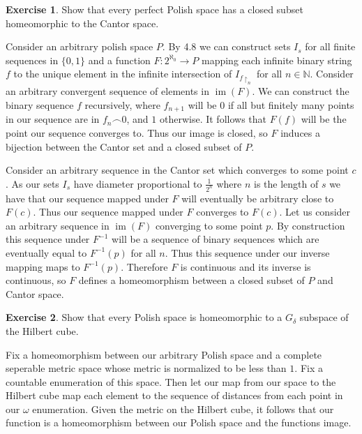 \documentclass{article}
\theoremstyle{definition}
\newtheorem{exer}{Exercise}[section]
\newcommand{\N}{\mathbb{N}}
\DeclareMathOperator{\im}{im}
\newlength{\defparindent}
\newenvironment{answer}
    {\begin{mdframed}[backgroundcolor=gray!15, linewidth=0pt] \setlength{\parindent}{\defparindent}}
    {\end{mdframed}}
\begin{document}
\begin{exer}
    Show that every perfect Polish space has a closed subset homeomorphic to the Cantor space.
    \begin{answer}
        Consider an arbitrary polish space $P$. By 4.8 we can construct sets $I_s$ for all finite sequences in $\{0, 1\}$ and a function $F: 2^{\aleph_0} \to P$ mapping each infinite binary string $f$ to the unique element in the infinite intersection of $I_{f\restriction_{n}}$ for all $n \in \N$. Consider an arbitrary convergent sequence of elements in $\im(F)$. We can construct the binary sequence $f$ recursively, where $f_{n + 1}$ will be $0$ if all but finitely many points in our sequence are in $f_{n} \frown 0$, and $1$ otherwise. It follows that $F(f)$ will be the point our sequence converges to. Thus our image is closed, so $F$ induces a bijection between the Cantor set and a closed subset of $P$.

        Consider an arbitrary sequence in the Cantor set which converges to some point $c$. As our sets $I_s$ have diameter proportional to $\frac{1}{2^n}$ where $n$ is the length of $s$ we have that our sequence mapped under $F$ will eventually be arbitrary close to $F(c)$. Thus our sequence mapped under $F$ converges to $F(c)$. Let us consider an arbitrary sequence in $\im(F)$ converging to some point $p$. By construction this sequence under $F^{-1}$ will be a sequence of binary sequences which are eventually equal to $F^{-1}(p)$ for all $n$. Thus this sequence under our inverse mapping maps to $F^{-1}(p)$. Therefore $F$ is continuous and its inverse is continuous, so $F$ defines a homeomorphism between a closed subset of $P$ and Cantor space. 
    \end{answer}
\end{exer}

\begin{exer}
    Show that every Polish space is homeomorphic to a $G_\delta$ subspace of the Hilbert cube.
    \begin{answer}
        Fix a homeomorphism between our arbitrary Polish space and a complete seperable metric space whose metric is normalized to be less than $1$. Fix a countable enumeration of this space. Then let our map from our space to the Hilbert cube map each element to the sequence of distances from each point in our $\omega$ enumeration. Given the metric on the Hilbert cube, it follows that our function is a homeomorphism between our Polish space and the functions image.
    \end{answer}
\end{exer}
\end{document}
